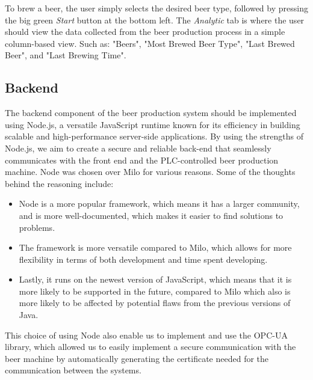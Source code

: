 To brew a beer, the user simply selects the desired beer type, followed by pressing the big green \textit{Start} button at the bottom left.
The \textit{Analytic} tab is where the user should view the data collected from the beer production process in a simple column-based view. Such as: "Beers", "Most Brewed Beer Type", "Last Brewed Beer", and "Last Brewing Time". \newline

\subsection{Backend}
The backend component of the beer production system should be implemented using Node.js, a versatile JavaScript runtime known for its efficiency in building scalable and high-performance server-side applications. By using the strengths of Node.js, we aim to create a secure and reliable back-end that seamlessly communicates with the front end and the PLC-controlled beer production machine. \cite{6}
Node was chosen over Milo for various reasons. Some of the thoughts behind the reasoning include:\cite{4}
\begin{itemize}
  \item Node is a more popular framework, which means it has a larger community, and is more well-documented, which makes it easier to find solutions to problems.
  \item The framework is more versatile compared to Milo, which allows for more flexibility in terms of both development and time spent developing.
  \item Lastly, it runs on the newest version of JavaScript, which means that it is more likely to be supported in the future, compared to Milo which also is more likely to be affected by potential flaws from the previous versions of Java. \newline
\end{itemize}
This choice of using Node also enable us to implement and use the OPC-UA library, which allowed us to easily implement a secure communication with the beer machine by automatically generating the certificate needed for the communication between the systems.

